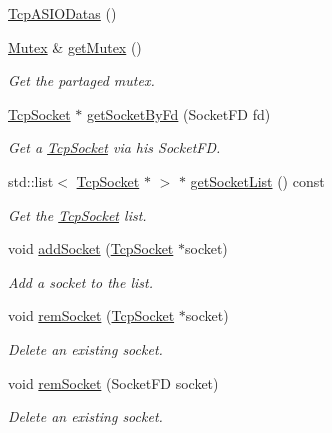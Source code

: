 \begin{DoxyCompactItemize}
\item 
\hyperlink{classmognetwork_1_1_tcp_a_s_i_o_datas_aefa4425a076fbfe35ff9420e63aa5a41}{Tcp\-A\-S\-I\-O\-Datas} ()
\item 
\hyperlink{classmognetwork_1_1_mutex}{Mutex} \& \hyperlink{classmognetwork_1_1_tcp_a_s_i_o_datas_a18fc361b81d7cdc4c70209cf24110766}{get\-Mutex} ()
\begin{DoxyCompactList}\small\item\em Get the partaged mutex. \end{DoxyCompactList}\item 
\hyperlink{classmognetwork_1_1_tcp_socket}{Tcp\-Socket} $\ast$ \hyperlink{classmognetwork_1_1_tcp_a_s_i_o_datas_a97b9895517d49687c35663ec4de5453e}{get\-Socket\-By\-Fd} (Socket\-F\-D fd)
\begin{DoxyCompactList}\small\item\em Get a \hyperlink{classmognetwork_1_1_tcp_socket}{Tcp\-Socket} via his Socket\-F\-D. \end{DoxyCompactList}\item 
std\-::list$<$ \hyperlink{classmognetwork_1_1_tcp_socket}{Tcp\-Socket} $\ast$ $>$ $\ast$ \hyperlink{classmognetwork_1_1_tcp_a_s_i_o_datas_a7c5c65122f57d2186fb735416a790763}{get\-Socket\-List} () const 
\begin{DoxyCompactList}\small\item\em Get the \hyperlink{classmognetwork_1_1_tcp_socket}{Tcp\-Socket} list. \end{DoxyCompactList}\item 
void \hyperlink{classmognetwork_1_1_tcp_a_s_i_o_datas_aa52b9fb9195d372f5b647d7631cf5b72}{add\-Socket} (\hyperlink{classmognetwork_1_1_tcp_socket}{Tcp\-Socket} $\ast$socket)
\begin{DoxyCompactList}\small\item\em Add a socket to the list. \end{DoxyCompactList}\item 
void \hyperlink{classmognetwork_1_1_tcp_a_s_i_o_datas_a49a15b15392fadb168ae376c72b7f9e0}{rem\-Socket} (\hyperlink{classmognetwork_1_1_tcp_socket}{Tcp\-Socket} $\ast$socket)
\begin{DoxyCompactList}\small\item\em Delete an existing socket. \end{DoxyCompactList}\item 
void \hyperlink{classmognetwork_1_1_tcp_a_s_i_o_datas_a4699eb56dd2868e62babcea3d2b6da00}{rem\-Socket} (Socket\-F\-D socket)
\begin{DoxyCompactList}\small\item\em Delete an existing socket. \end{DoxyCompactList}\end{DoxyCompactItemize}

